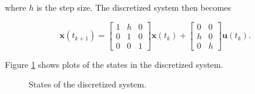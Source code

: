 \documentclass{article}
\begin{document}
where $h$ is the step size. The discretized system then becomes

\begin{equation}
	\bm{x}(t_{k+1}) =
	\begin{bmatrix}
		1 & h & 0 \\
		0 & 1 & 0 \\
		0 & 0 & 1
	\end{bmatrix}
	\bm{x}(t_k) + 
	\begin{bmatrix}
		0 & 0 \\
		h & 0 \\
		0 & h
	\end{bmatrix}
	\bm{u}(t_k).
\end{equation}

Figure \ref{fig:disc_states} shows plots of the states in the discretized system.

\begin{figure}[!ht]
    \centering
    \caption{States of the discretized system.}
    \label{fig:disc_states}
\end{figure}
\end{document}
